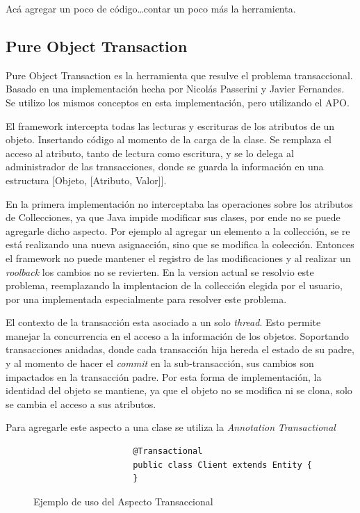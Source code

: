 	Acá agregar un poco de código\ldots contar un poco más la herramienta.


	\subsection{Pure Object Transaction} 
		Pure Object Transaction es la herramienta que resulve el problema
		transaccional. Basado en una implementación hecha por
		Nicolás Passerini y Javier Fernandes. Se utilizo los mismos conceptos en esta
		implementación, pero utilizando el APO.
		 
		El framework intercepta todas las lecturas	y escrituras de los atributos de un
		objeto.	Insertando código al momento de la carga de la clase.
		Se remplaza el acceso al atributo, tanto de lectura como escritura, y se lo
		delega al administrador de las transacciones, donde se guarda la información
		en una estructura [Objeto, [Atributo, Valor]].
		
		\medskip
		
		En la primera implementación no interceptaba las operaciones sobre los
		atributos de Collecciones, ya que Java impide modificar sus clases, por
		ende no se puede agregarle dicho aspecto.
		Por ejemplo al agregar un elemento a la collección, se re está realizando una
		nueva asignacción, sino que se modifica la colección. Entonces el framework no
		puede mantener el registro de las modificaciones y al realizar un
		\emph{roolback} los cambios no se revierten.
		En la version actual se resolvio este problema, reemplazando la implentacion
		de la collección elegida por el usuario, por una implementada especialmente
		para resolver este problema.
		
		\medskip
		
		El contexto de la transacción esta asociado a un solo \emph{thread}. Esto
		permite manejar la concurrencia en el acceso a la información de los objetos. 
		Soportando transacciones anidadas, donde cada transacción hija hereda el estado
		de su padre, y al momento de hacer el \emph{commit} en la sub-transacción, sus
		cambios son impactados en la transacción padre.
		Por esta forma de implementación, la identidad del objeto se mantiene, ya que
		el objeto no se modifica ni se clona, solo se cambia el acceso a sus
		atributos.
		
		Para agregarle este aspecto a una clase se utiliza la \emph{Annotation}
		\emph{Transactional }
				
		\begin{figure}[h]
				\begin{lstlisting} 
					@Transactional
					public class Client extends Entity {
					}
				\end{lstlisting}
			\caption{Ejemplo de uso del Aspecto Transaccional}
			\label{pot}
		\end{figure}  

